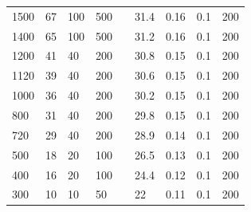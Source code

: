 \documentclass{article}
\begin{document}
\begin{longtable}[c]{|l|l|l|l|l|l|l|l|l|}
    1500          & 67                        & 100                       & 500                       &  & 31.4       & 0.16                      & 0.1                       & 200                       \\ \cline{1-4} \cline{6-9}
    1400          & 65                        & 100                       & 500                       &  & 31.2       & 0.16                      & 0.1                       & 200                       \\ \cline{1-4} \cline{6-9}
    1200          & 41                        & 40                        & 200                       &  & 30.8       & 0.15                      & 0.1                       & 200                       \\ \cline{1-4} \cline{6-9}
    1120          & 39                        & 40                        & 200                       &  & 30.6       & 0.15                      & 0.1                       & 200                       \\ \cline{1-4} \cline{6-9}
    1000          & 36                        & 40                        & 200                       &  & 30.2       & 0.15                      & 0.1                       & 200                       \\ \cline{1-4} \cline{6-9}
    800           & 31                        & 40                        & 200                       &  & 29.8       & 0.15                      & 0.1                       & 200                       \\ \cline{1-4} \cline{6-9}
    720           & 29                        & 40                        & 200                       &  & 28.9       & 0.14                      & 0.1                       & 200                       \\ \cline{1-4} \cline{6-9}
    500           & 18                        & 20                        & 100                       &  & 26.5       & 0.13                      & 0.1                       & 200                       \\ \cline{1-4} \cline{6-9}
    400           & 16                        & 20                        & 100                       &  & 24.4       & 0.12                      & 0.1                       & 200                       \\ \cline{1-4} \cline{6-9}
    300           & 10                        & 10                        & 50                        &  & 22         & 0.11                      & 0.1                       & 200                       \\ \cline{1-4} \cline{6-9}

\end{longtable}
\end{document}
